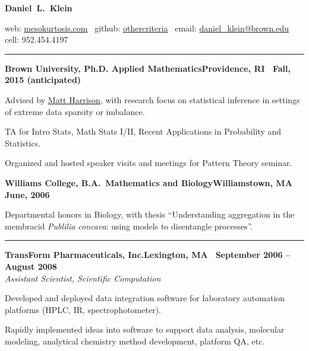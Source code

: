 \documentclass{article}
\newcommand{\ressection}[1]{\noindent{\large\textbf{#1}}\vspace{2pt}\hrule\vspace{4pt}}
\newcommand{\leftandright}[2]{\noindent\textbf{#1}\hfill\textbf{#2}}
\begin{document}
\sffamily

\begin{center}
\textbf{\huge{Daniel~L.~Klein}}

web: \href{http://mesokurtosis.com}{mesokurtosis.com}
\textbullet\, github: \href{https://gititbub.com/othercriteria}{othercriteria}
\textbullet\, email: \href{mailto:daniel_klein@brown.edu}{daniel\_klein@brown.edu}
\textbullet\, cell: 952.454.4197
\end{center}

\ressection{Education}

\leftandright{Brown University, \textmd{Ph.D. Applied
    Mathematics}}{Providence, RI \textbullet\ Fall, 2015 (anticipated)}
\begin{itemize*}
\item Advised by \href{http://www.dam.brown.edu/people/harrison}{Matt
    Harrison}, with research focus on statistical inference in
  settings of extreme data sparsity or imbalance.
\item TA for Intro Stats, Math Stats I/II, Recent Applications in
  Probability and Statistics.
\item Organized and hosted speaker visits and meetings for Pattern
  Theory seminar.
\end{itemize*}

\leftandright{Williams College, \textmd{B.A.\ Mathematics and
    Biology}}{Williamstown, MA \textbullet\, June, 2006}
\begin{itemize*}
\item Departmental honors in Biology, with thesis ``Understanding
  aggregation in the membracid \emph{Publilia concava}: using models
  to disentangle processes''.
\end{itemize*}

\vspace{1.0em}

\ressection{Work experience}

\leftandright{TransForm Pharmaceuticals, Inc.}{Lexington, MA
  \textbullet\, September 2006 -- August 2008} \\
\textit{Assistant Scientist, Scientific Computation}

\begin{itemize*}
\item Developed and deployed data integration software for laboratory
  automation platforms (HPLC, IR, spectrophotometer).
\item Rapidly implemented ideas into software to support data
  analysis, molecular modeling, analytical chemistry method
  development, platform QA, etc.
\end{itemize*}
\end{document}
